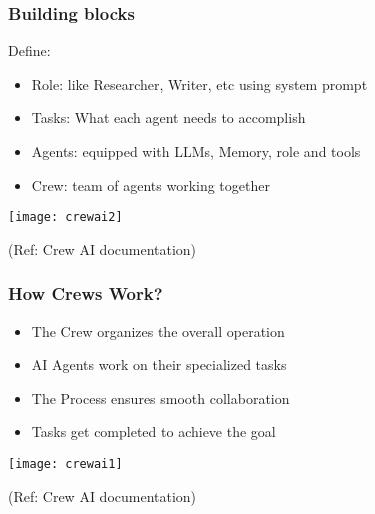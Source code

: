 \begin{frame}[fragile]\frametitle{Building blocks}

Define:
    \begin{itemize}
        \item Role: like Researcher, Writer, etc using system prompt
		\item Tasks: What each agent needs to accomplish
		\item Agents: equipped with LLMs, Memory, role and tools
		\item Crew: team of agents working together
    \end{itemize}
	
		\begin{center}
		\texttt{[image: crewai2]}
		
		{\tiny (Ref: Crew AI documentation)}	
		\end{center}		
		
\end{frame}

\begin{frame}[fragile]\frametitle{How Crews Work?}
      \begin{itemize}
        \item The Crew organizes the overall operation
        \item AI Agents work on their specialized tasks
        \item The Process ensures smooth collaboration
        \item Tasks get completed to achieve the goal
      \end{itemize}
	  
		\begin{center}
		\texttt{[image: crewai1]}
		
		{\tiny (Ref: Crew AI documentation)}
		\end{center}		  
\end{frame}
		
